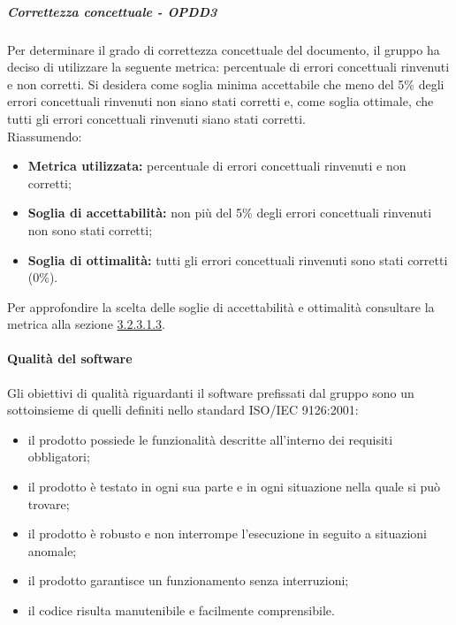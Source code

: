 \documentclass[PianoDiQualifica.tex]{subfiles}
\begin{document}
				\subparagraph{Correttezza concettuale - OPDD3}
				Per determinare il grado di correttezza concettuale del documento, il gruppo ha deciso di utilizzare la seguente metrica: percentuale di errori concettuali rinvenuti e non corretti.
				Si desidera come soglia minima accettabile che meno del 5\% degli errori concettuali rinvenuti non siano stati corretti e, come soglia ottimale, che tutti gli errori
				concettuali rinvenuti siano stati corretti.\\
				Riassumendo:
				\begin{itemize}
				\item \textbf{Metrica utilizzata:} percentuale di errori concettuali rinvenuti e non corretti;
				\item \textbf{Soglia di accettabilità:} non più del 5\% degli errori concettuali rinvenuti non sono stati corretti;
				\item \textbf{Soglia di ottimalità:} tutti gli errori concettuali rinvenuti sono stati corretti (0\%).
				\end{itemize}
				Per approfondire la scelta delle soglie di accettabilità e ottimalità consultare la metrica alla sezione \hyperlink{err_concettuali}{3.2.3.1.3}.

			\paragraph{Qualità del software}
			Gli obiettivi di qualità riguardanti il software prefissati dal gruppo \GRUPPO{} sono un sottoinsieme di quelli definiti nello standard ISO/IEC 9126:2001:
			\begin{itemize}
				\item il prodotto possiede le funzionalità descritte all’interno dei requisiti obbligatori;
				\item il prodotto è testato in ogni sua parte e in ogni situazione nella quale si può trovare;
				\item il prodotto è robusto e non interrompe l’esecuzione in seguito a situazioni anomale;
				\item il prodotto garantisce un funzionamento senza interruzioni;
				\item il codice risulta manutenibile e facilmente comprensibile.
			\end{itemize}
\end{document}
